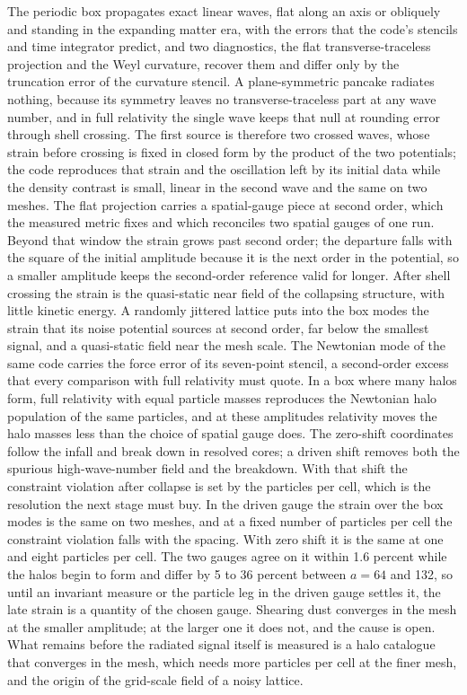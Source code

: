 \documentclass[aps,prd,twocolumn,10pt,superscriptaddress,nofootinbib,longbibliography,floatfix]{revtex4-2}
\begin{document}
The periodic box propagates exact linear waves, flat along an axis or obliquely and standing in the expanding matter era, with the errors that the code's stencils and time integrator predict, and two diagnostics, the flat transverse-traceless projection and the Weyl curvature, recover them and differ only by the truncation error of the curvature stencil. A plane-symmetric pancake radiates nothing, because its symmetry leaves no transverse-traceless part at any wave number, and in full relativity the single wave keeps that null at rounding error through shell crossing. The first source is therefore two crossed waves, whose strain before crossing is fixed in closed form by the product of the two potentials; the code reproduces that strain and the oscillation left by its initial data while the density contrast is small, linear in the second wave and the same on two meshes. The flat projection carries a spatial-gauge piece at second order, which the measured metric fixes and which reconciles two spatial gauges of one run. Beyond that window the strain grows past second order; the departure falls with the square of the initial amplitude because it is the next order in the potential, so a smaller amplitude keeps the second-order reference valid for longer. After shell crossing the strain is the quasi-static near field of the collapsing structure, with little kinetic energy. A randomly jittered lattice puts into the box modes the strain that its noise potential sources at second order, far below the smallest signal, and a quasi-static field near the mesh scale. The Newtonian mode of the same code carries the force error of its seven-point stencil, a second-order excess that every comparison with full relativity must quote. In a box where many halos form, full relativity with equal particle masses reproduces the Newtonian halo population of the same particles, and at these amplitudes relativity moves the halo masses less than the choice of spatial gauge does. The zero-shift coordinates follow the infall and break down in resolved cores; a driven shift removes both the spurious high-wave-number field and the breakdown. With that shift the constraint violation after collapse is set by the particles per cell, which is the resolution the next stage must buy. In the driven gauge the strain over the box modes is the same on two meshes, and at a fixed number of particles per cell the constraint violation falls with the spacing. With zero shift it is the same at one and eight particles per cell. The two gauges agree on it within 1.6 percent while the halos begin to form and differ by 5 to 36 percent between $a=64$ and 132, so until an invariant measure or the particle leg in the driven gauge settles it, the late strain is a quantity of the chosen gauge. Shearing dust converges in the mesh at the smaller amplitude; at the larger one it does not, and the cause is open. What remains before the radiated signal itself is measured is a halo catalogue that converges in the mesh, which needs more particles per cell at the finer mesh, and the origin of the grid-scale field of a noisy lattice.
\end{document}
